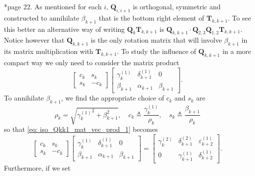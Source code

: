 \cite{ChoiSou-ChengTerrya2007Imfs}*{page 22}. As mentioned for each $i$, $\bm{Q}_{i,i+1}$ is orthogonal, symmetric and constructed to annihilate $\beta_{k+1}$ that is the bottom right element of $\bm{T}_{k,k+1}$. To see this better an alternative way of writing $\bm{Q}_k \bm{T}_{k,k+1}$ is $\bm{Q}_{k,k+1} \cdot \bm{Q}_{2,3}\bm{Q}_{1,2} \bm{T}_{k,k+1}$. Notice however that $\bm{Q}_{k,k+1}$ is the only rotation matrix that will involve $\beta_{k+1}$ in its matrix multiplication with $\bm{T}_{k,k+1}$. To study the influence of $\bm{Q}_{k,k+1}$ in a more compact way we only need to consider the matrix product
\begin{equation} \label{eq: iso_Qkk1_mat_vec_prod_1}
    \begin{bmatrix}
        c_k & s_k  \\
        s_k & -c_k
    \end{bmatrix}
    \begin{bmatrix}
        \gamma_{k}^{(1)} & \delta_{k+1}^{(1)} & 0           \\
        \beta_{k+1}      & \alpha_{k+1}       & \beta_{k+1}
    \end{bmatrix}.
\end{equation}
To annihilate $\beta_{k+1}$, we find the appropriate choice of $c_k$ and $s_k$ are
\begin{equation*}
    \rho_k = \sqrt{{\gamma_k^{(1)}}^{2} + \beta_{k+1}^{2}}, \quad c_k \triangleq \frac{\gamma_{k}^{(1)}}{\rho_k}, \quad s_k \triangleq \frac{\beta_{k+1}}{\rho_{k}}
\end{equation*}
so that \ref{eq: iso_Qkk1_mat_vec_prod_1} becomes
\begin{equation*}
    \begin{bmatrix}
        c_k & s_k  \\
        s_k & -c_k
    \end{bmatrix}
    \begin{bmatrix}
        \gamma_{k}^{(1)} & \delta_{k+1}^{(1)} & 0           \\
        \beta_{k+1}      & \alpha_{k+1}       & \beta_{k+1}
    \end{bmatrix}
    =
    \begin{bmatrix}
        \gamma_{k}^{(2)} & \delta_{k+1}^{(2)} & \varepsilon_{k+2}^{(1)} \\
        0                & \gamma_{k+1}^{(1)} & \delta_{k+2}^{(1)}
    \end{bmatrix}.
\end{equation*}
Furthermore, if we set
